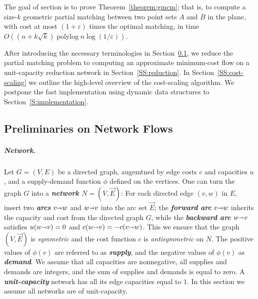 \documentclass[a4paper,UKenglish]{socg-lipics-v2018}
\def\polylog{\mathop{\mathrm{polylog}}}
\def\eps{\varepsilon}
\def\fsupply{\phi}
\def\arcto{\mathord\shortrightarrow}
\def\arc#1#2{#1\arcto#2}
\theoremstyle{plain}
\numberwithin{figure}{section}
\renewcommand{\paragraph}{\subparagraph}
\def\EMPH#1{\textbf{\emph{\boldmath #1}}}
\begin{document}
The goal of section is to prove Theorem~\ref{theorem:gmcm}; that is, to compute a size-$k$ geometric partial matching between two point sets $A$ and $B$ in the plane, with cost at most $(1+\eps)$ times the optimal matching, in time $O((n + k\sqrt{k})\polylog n \log(1/\eps))$.
%

After introducing the necessary terminologies in Section~\ref{SS:prelim-flow}, we reduce the partial matching problem to computing an approximate minimum-cost flow on a unit-capacity reduction network in Section~\ref{SS:reduction}.
In Section~\ref{SS:cost-scaling} we outline the high-level overview of the cost-scaling algorithm.
We postpone the fast implementation using dynamic data structures to Section~\ref{S:implementation}.

\subsection{Preliminaries on Network Flows}
\label{SS:prelim-flow}

\paragraph{Network.}
Let $G=(V,E)$ be a directed graph, augemtned by edge costs $c$ and capacities $u$, and a supply-demand function $\fsupply$ defined on the vertices.
%
One can turn the graph $G$ into a \EMPH{network $N = (V, \vec{E})$}:
For each directed edge $(v,w)$ in $E$, insert two \EMPH{arcs} $\arc vw$ and $\arc wv$ into the arc set $\vec{E}$; the \EMPH{forward arc} $\arc vw$ inherits the capacity and cost from the directed graph $G$,
while the \EMPH{backward arc} $\arc wv$ satisfies $u(\arc wv) = 0$ and $c(\arc wv) = -c(\arc vw)$.  This we ensure that the graph $(V,\vec{E})$ is \emph{symmetric} and the cost function $c$ is \emph{antisymmetric} on $N$.
%
The positive values of $\fsupply(v)$ are referred to as \EMPH{supply}, and the negative values of $\fsupply(v)$ as \EMPH{demand}.
We assume that all capacities are nonnegative, all supplies and demands are integers, and the sum of supplies and demands is equal to zero.
%
A \EMPH{unit-capacity} network has all its edge capacities equal to $1$.
In this section we assume all networks are of unit-capacity.
\end{document}
